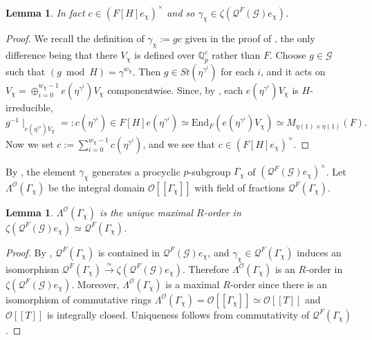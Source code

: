 \documentclass[12pt]{amsart}
\theoremstyle{plain}
\newtheorem{lemma}[theorem]{Lemma}
\theoremstyle{remark}
\theoremstyle{definition}
\numberwithin{equation}{section}
\begin{document}
\begin{lemma}\label{lem:c-in-F[H]}
In fact  $c \in (F[H]e_{\chi})^{\times}$ and so
$\gamma_{\chi} \in \zeta(\mathcal{Q}^{F}(\mathcal{G})e_{\chi})$.
\end{lemma}

\begin{proof}
We recall the definition of $\gamma_{\chi} := gc$ given in the proof of \cite[Proposition 5]{MR2114937}, the only difference
being that there $V_{\chi}$ is defined over ${\mathbb{Q}}_{p}^{c}$ rather than $F$.
Choose $g \in \mathcal{G}$ such that $(g \bmod H) = \gamma^{w_{\chi}}$.
Then $g \in St(\eta^{\gamma^{i}})$ for each $i$,
and it acts on $V_{\chi} = \oplus_{i=0}^{w_{\chi}-1} e(\eta^{\gamma^{i}}) V_{\chi}$ componentwise.
Since, by \cite[Lemma 4]{MR2114937}, each $e(\eta^{\gamma^{i}}) V_{\chi}$ is $H$-irreducible,
\[
g^{-1} \mid_{e(\eta^{\gamma^{i}})V_{\chi}} =: c(\eta^{\gamma^{i}}) \in F[H]e(\eta^{\gamma^{i}}) \simeq {\mathrm{End}}_{F}(e(\eta^{\gamma^{i}})V_{\chi})
\simeq M_{\eta(1) \times \eta(1)}(F).
\]
Now we set $c:=\sum_{i=0}^{w_{\chi}-1} c(\eta^{\gamma^{i}})$, and we see that $c \in (F[H]e_{\chi})^{\times}$.
\end{proof}

By \cite[Proposition 5]{MR2114937}, the element $\gamma_{\chi}$
generates a procyclic $p$-subgroup $\Gamma_{\chi}$ of $(\mathcal{Q}^{F}(\mathcal{G})e_{\chi})^{\times}$.
Let $\Lambda^{\mathcal{O}}(\Gamma_{\chi})$ be the integral domain $\mathcal{O}[[\Gamma_{\chi}]]$
with field of fractions $\mathcal{Q}^{F}(\Gamma_{\chi})$.

\begin{lemma}\label{lem:unique-max-order-in-centre}
$\Lambda^{\mathcal{O}}(\Gamma_{\chi})$ is the unique maximal $R$-order in $\zeta(\mathcal{Q}^{F}(\mathcal{G})e_{\chi})\simeq \mathcal{Q}^{F}(\Gamma_{\chi})$.
\end{lemma}

\begin{proof}
By \cite[Proposition 6]{MR2114937}, $\mathcal{Q}^{F}(\Gamma_{\chi})$ is contained in $\mathcal{Q}^{F}(\mathcal{G})e_{\chi}$,
and $\gamma_{\chi} \in \mathcal{Q}^{F}(\Gamma_{\chi})$ induces an isomorphism
$\mathcal{Q}^{F}(\Gamma_{\chi}) \stackrel{\simeq}{\longrightarrow} \zeta(\mathcal{Q}^{F}(\mathcal{G})e_{\chi})$.
Therefore $\Lambda^{\mathcal{O}}(\Gamma_{\chi})$ is an $R$-order in $\zeta(\mathcal{Q}^{F}(\mathcal{G})e_{\chi})$.
Moreover, $\Lambda^{\mathcal{O}}(\Gamma_{\chi})$ is a maximal $R$-order since there is an isomorphism of commutative rings
 $\Lambda^{\mathcal{O}}(\Gamma_{\chi}) = \mathcal{O}[[\Gamma_{\chi}]] \simeq \mathcal{O}[[T]]$ and $\mathcal{O}[[T]]$ is integrally closed. Uniqueness follows from commutativity of $\mathcal{Q}^{F}(\Gamma_{\chi})$.
\end{proof}
\end{document}

